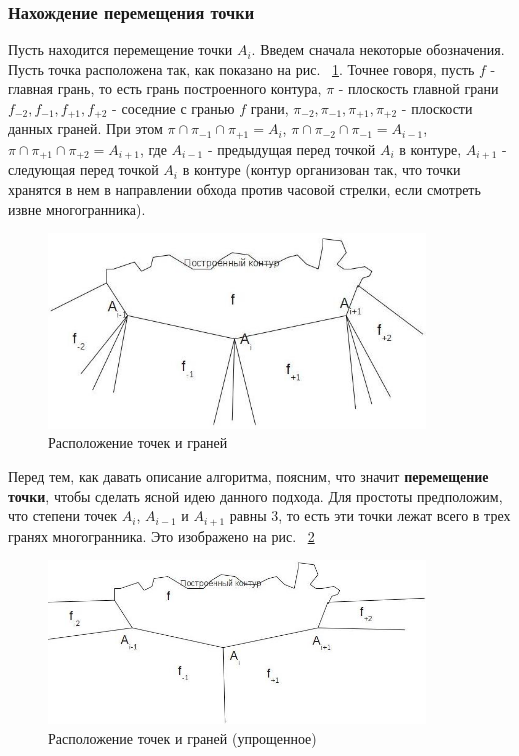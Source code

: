 \documentclass[a4paper,12pt, titlepage]{article}
\begin{document}
\subsubsection{Нахождение перемещения точки}
\begin{flushleft}
 Пусть находится перемещение точки $A_{i}$. Введем сначала некоторые обозначения. Пусть точка расположена
так, как показано на рис. ~\ref{pic-step-1}. Точнее говоря, пусть $f$ - главная грань, то есть грань 
построенного контура, $\pi$ - плоскость главной грани $f_{-2}, f_{-1}, f_{+1}, f_{+2}$ - соседние 
с гранью $f$ грани, $\pi_{-2}, \pi_{-1}, \pi_{+1}, \pi_{+2}$ - плоскости данных граней. При этом 
$\pi \cap \pi_{-1} \cap \pi_{+1} = A_{i}$, $\pi \cap \pi_{-2} \cap \pi_{-1} = A_{i-1}$,
$\pi \cap \pi_{+1} \cap \pi_{+2} = A_{i+1}$, где $A_{i - 1}$ - предыдущая перед точкой $A_{i}$ в контуре,
$A_{i + 1}$ - следующая перед точкой $A_{i}$ в контуре (контур организован так, что точки хранятся в нем
в направлении обхода против часовой стрелки, если смотреть извне многогранника).
\end{flushleft}
\begin{flushleft}
  \begin{figure}[h]
    \includegraphics[clip, width=10cm]{img/pic-step-1.jpg}
    \caption{Расположение точек и граней}\label{pic-step-1}
  \end{figure}
\end{flushleft}
\begin{flushleft}
 Перед тем, как давать описание алгоритма, поясним, что значит \textbf{перемещение точки}, чтобы сделать
ясной идею данного подхода. Для простоты предположим, что степени точек $A_{i}$, $A_{i - 1}$ и $A_{i + 1}$
равны 3, то есть эти точки лежат всего в трех гранях многогранника. Это изображено на рис.
~\ref{pic-step-2}
\end{flushleft}
\begin{flushleft}
  \begin{figure}[h]
    \includegraphics[clip, width=10cm]{img/pic-step-2.jpg}
    \caption{Расположение точек и граней (упрощенное)}\label{pic-step-2}
  \end{figure}
\end{flushleft}
\end{document}
